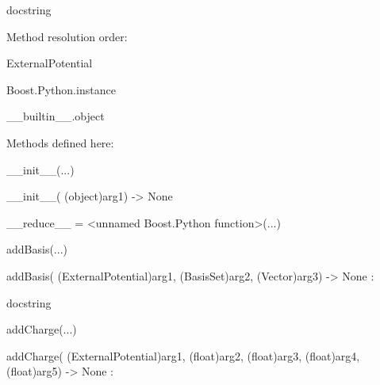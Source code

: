 \documentclass[letterpaper,10pt,english]{sphinxmanual}
\begin{document}
\begin{description}
\begin{description}
\item[{class ExternalPotential(Boost.Python.instance)}] \leavevmode
\begin{DUlineblock}{0em}
\item[] docstring
\item[] 
\item[] Method resolution order:
\item[]
\begin{DUlineblock}{\DUlineblockindent}
\item[] ExternalPotential
\item[] Boost.Python.instance
\item[] \_\_builtin\_\_.object
\item[] 
\end{DUlineblock}
\item[] Methods defined here:
\item[] 
\item[] \_\_init\_\_(...)
\item[]
\begin{DUlineblock}{\DUlineblockindent}
\item[] \_\_init\_\_( (object)arg1) -\textgreater{} None
\item[] 
\end{DUlineblock}
\item[] \_\_reduce\_\_ = \textless{}unnamed Boost.Python function\textgreater{}(...)
\item[] 
\item[] addBasis(...)
\item[]
\begin{DUlineblock}{\DUlineblockindent}
\item[] addBasis( (ExternalPotential)arg1, (BasisSet)arg2, (Vector)arg3) -\textgreater{} None :
\item[]
\begin{DUlineblock}{\DUlineblockindent}
\item[] docstring
\item[] 
\end{DUlineblock}
\end{DUlineblock}
\item[] addCharge(...)
\item[]
\begin{DUlineblock}{\DUlineblockindent}
\item[] addCharge( (ExternalPotential)arg1, (float)arg2, (float)arg3, (float)arg4, (float)arg5) -\textgreater{} None :
\item[]
\begin{DUlineblock}{\DUlineblockindent}

\end{DUlineblock}
\end{DUlineblock}
\end{DUlineblock}
\end{description}
\end{description}
\end{document}

